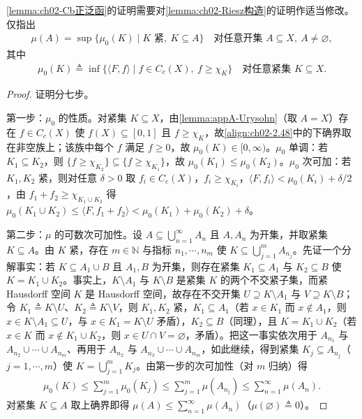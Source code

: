 \documentclass[../../main.tex]{subfiles}%
\begin{document}
\cref{lemma:ch02-Cb正泛函}的证明需要对\cref{lemma:ch02-Riesz构造}的证明作适当修改。仅指出
\begin{align}
\mu(A)=\sup\{\mu_0(K)\mid K\text{ 紧},\ K\subseteq A\}\quad\text{对任意开集 }A\subseteq X,\ A\neq\varnothing , \label{align:ch02-2.47}
\end{align}
其中
\begin{align}
\mu_0(K)\triangleq\inf\{\langle F,f\rangle\mid f\in C_c(X),\ f\geqslant\chi_K\}\quad\text{对任意紧集 }K\subseteq X. \label{align:ch02-2.48}
\end{align}

\begin{proof}
证明分七步。

第一步：$\mu_0$ 的性质。对紧集 $K\subseteq X$，由\cref{lemma:appA-Urysohn}（取 $A=X$）存在 $f\in C_c(X)$ 使 $f(X)\subseteq[0,1]$ 且 $f\geqslant\chi_K$，故\eqref{align:ch02-2.48}中的下确界取在非空族上；该族中每个 $f$ 满足 $f\geqslant0$，故 $\mu_0(K)\in[0,\infty)$。$\mu_0$ 单调：若 $K_1\subseteq K_2$，则 $\{f\geqslant\chi_{K_2}\}\subseteq\{f\geqslant\chi_{K_1}\}$，故 $\mu_0(K_1)\leqslant\mu_0(K_2)$。$\mu_0$ 次可加：若 $K_1,K_2$ 紧，则对任意 $\delta>0$ 取 $f_i\in C_c(X)$，$f_i\geqslant\chi_{K_i}$，$\langle F,f_i\rangle<\mu_0(K_i)+\delta/2$，由 $f_1+f_2\geqslant\chi_{K_1\cup K_2}$ 得 $\mu_0(K_1\cup K_2)\leqslant\langle F,f_1+f_2\rangle<\mu_0(K_1)+\mu_0(K_2)+\delta$。

第二步：$\mu$ 的可数次可加性。设 $A\subseteq\bigcup_{n=1}^\infty A_n$ 且 $A,A_n$ 为开集，并取紧集 $K\subseteq A$。由 $K$ 紧，存在 $m\in\mathbb N$ 与指标 $n_1,\cdots,n_m$ 使 $K\subseteq\bigcup_{j=1}^mA_{n_j}$。先证一个分解事实：若 $K\subseteq A_1\cup B$ 且 $A_1,B$ 为开集，则存在紧集 $K_1\subseteq A_1$ 与 $K_2\subseteq B$ 使 $K=K_1\cup K_2$。事实上，$K\setminus A_1$ 与 $K\setminus B$ 是紧集 $K$ 的两个不交紧子集，而紧 Hausdorff 空间 $K$ 是 Hausdorff 空间，故存在不交开集 $U\supseteq K\setminus A_1$ 与 $V\supseteq K\setminus B$；令 $K_1\triangleq K\setminus U$、$K_2\triangleq K\setminus V$，则 $K_1,K_2$ 紧，$K_1\subseteq A_1$（若 $x\in K_1$ 而 $x\notin A_1$，则 $x\in K\setminus A_1\subseteq U$，与 $x\in K_1=K\setminus U$ 矛盾），$K_2\subseteq B$（同理），且 $K=K_1\cup K_2$（若 $x\in K$ 而 $x\notin K_1\cup K_2$，则 $x\in U\cap V=\varnothing$，矛盾）。把这一事实依次用于 $A_{n_1}$ 与 $A_{n_2}\cup\cdots\cup A_{n_m}$、再用于 $A_{n_2}$ 与 $A_{n_3}\cup\cdots\cup A_{n_m}$，如此继续，得到紧集 $K_j\subseteq A_{n_j}$（$j=1,\cdots,m$）使 $K=\bigcup_{j=1}^mK_j$。由第一步的次可加性（对 $m$ 归纳）得
\begin{align*}
\mu_0(K)\leqslant\sum_{j=1}^m\mu_0(K_j)\leqslant\sum_{j=1}^m\mu(A_{n_j})\leqslant\sum_{n=1}^\infty\mu(A_n).
\end{align*}
对紧集 $K\subseteq A$ 取上确界即得 $\mu(A)\leqslant\sum_{n=1}^\infty\mu(A_n)$（$\mu(\varnothing)\triangleq0$）。


\end{proof}
\end{document}
